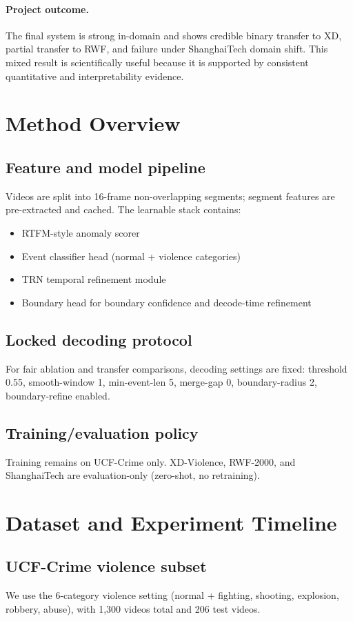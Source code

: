 \documentclass[11pt]{article}
\begin{document}
\paragraph{Project outcome.}
The final system is strong in-domain and shows credible binary transfer to XD, partial transfer to RWF, and failure under ShanghaiTech domain shift. This mixed result is scientifically useful because it is supported by consistent quantitative and interpretability evidence.

\section{Method Overview}
\subsection{Feature and model pipeline}
Videos are split into 16-frame non-overlapping segments; segment features are pre-extracted and cached. The learnable stack contains:
\begin{itemize}
  \item RTFM-style anomaly scorer \citep{tian2021weakly}
  \item Event classifier head (normal + violence categories)
  \item TRN temporal refinement module
  \item Boundary head for boundary confidence and decode-time refinement
\end{itemize}

\subsection{Locked decoding protocol}
For fair ablation and transfer comparisons, decoding settings are fixed:
threshold 0.55, smooth-window 1, min-event-len 5, merge-gap 0,
boundary-radius 2, boundary-refine enabled.

\subsection{Training/evaluation policy}
Training remains on UCF-Crime only. XD-Violence, RWF-2000, and ShanghaiTech are evaluation-only (zero-shot, no retraining).

\section{Dataset and Experiment Timeline}
\subsection{UCF-Crime violence subset}
We use the 6-category violence setting (normal + fighting, shooting, explosion, robbery, abuse), with 1,300 videos total and 206 test videos.
\end{document}
